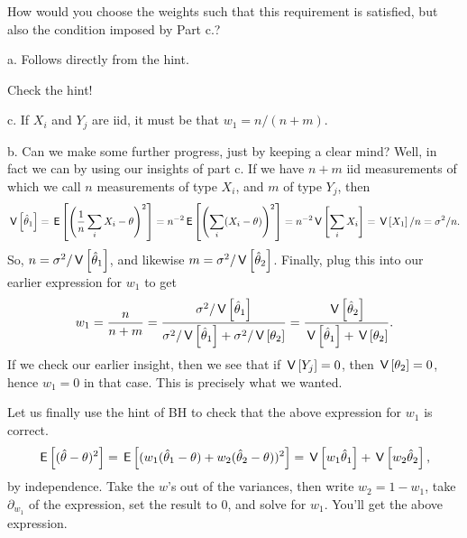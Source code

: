 \begin{exercise}
\begin{hint}
How would you choose the weights such that this requirement is satisfied, but also the condition imposed by Part c.?



\end{hint}


\begin{solution}
a. Follows directly from the hint.

Check the hint!

c.  If $X_i$ and $Y_j$ are iid, it must be that $w_{1} = n/(n+m)$.

b. Can we make some further progress, just by keeping a clear mind?
Well, in fact we can by using our insights of part c.
If we have $n+m$ iid measurements of which we call $n$ measurements of type $X_i$, and $m$ of type $Y_{j}$, then
\begin{align*}
\,\mathsf{V}\left[\hat \theta_{1}\right]  =  \,\mathsf{E}\left[\left(\frac{1}{n}\sum_{i}X_{i} - \theta\right)^2\right] = n^{-2}\,\mathsf{E}\left[\left(\sum_i (X_{i}-\theta)\right)^{2}\right] = n^{-2}\,\mathsf{V}\left[\sum_i X_i\right] = \,\mathsf{V}\left[X_1\right]/n = \sigma^{2}/n.
\end{align*}
So, $n=\sigma^{2}/\,\mathsf{V}\left[\hat \theta_1\right]$, and likewise $m=\sigma^{2}/\,\mathsf{V}\left[\hat \theta_2\right]$. Finally, plug this into our earlier expression for $w_1$ to  get
\begin{align*}
w_1 = \frac n {n+m} = \frac{\sigma^2/\,\mathsf{V}\left[\hat \theta_1\right]}{\sigma^2/\,\mathsf{V}\left[\hat \theta_1\right] + \sigma^2/\,\mathsf{V}\left[\theta_2\right]} = \frac{\,\mathsf{V}\left[\hat \theta_2\right]}{\,\mathsf{V}\left[\hat \theta_1\right] + \,\mathsf{V}\left[\theta_2\right]}.
\end{align*}
If we check our earlier insight, then we see that if $\,\mathsf{V}\left[Y_j\right]=0$, then $\,\mathsf{V}\left[\theta_2\right]=0$, hence $w_1=0$ in that case. This is precisely what we wanted.

Let us finally use the  hint of BH to check that the above expression for $w_1$ is correct.
\begin{align*}
\,\mathsf{E}\left[(\hat \theta -\theta)^{2}\right] =
\,\mathsf{E}\left[(w_1(\hat \theta_{1} - \theta) + w_2(\hat \theta_{2}-\theta))^{2}\right] =
\,\mathsf{V}\left[w_1 \hat \theta_{1}\right] + \,\mathsf{V}\left[w_2 \hat \theta_{2}\right],
\end{align*}
by independence. Take the $w$'s out of the variances, then write $w_2=1-w_1$, take $\partial_{w_1}$ of the expression,  set the result to 0, and solve for $w_1$. You'll get the above expression.
\end{solution}
\end{exercise}

